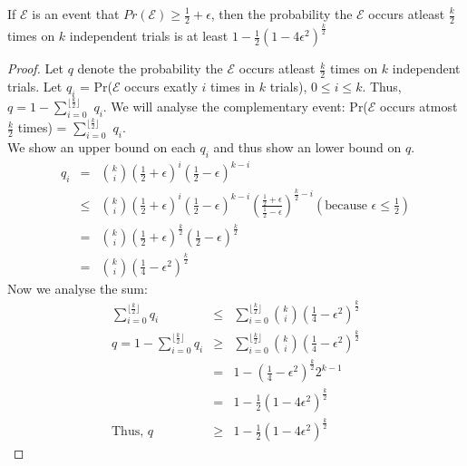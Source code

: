\begin{lemma}
If $\mathcal{E}$ is an event that $Pr(\mathcal{E}) \geq \frac{1}{2} + \epsilon $, then the probability the $\mathcal{E}$ occurs atleast $\frac {k}{2}$ times on $k$ independent trials is at least 
$1-\frac{1}{2}(1-4\epsilon^2)^\frac{k}{2}$
\end{lemma}
\begin{proof}
Let $q$ denote the probability the $\mathcal{E}$ occurs atleast $\frac {k}{2}$ times on $k$ independent trials.
Let $q_i$ = Pr($\mathcal{E}$ occurs exatly $i$ times in $k$ trials), $0 \leq i \leq k$. Thus,
$q = 1 - \sum_{i=0}^{\lfloor\frac{k}{2}\rfloor}$ $q_i$. We will analyse the complementary event:
Pr($\mathcal{E}$ occurs atmost $\frac{k}{2}$ times) = $\sum_{i=0}^{\lfloor\frac{k}{2}\rfloor}$ $q_i$. \\ 
We show an upper bound on each $q_i$ and thus show an lower bound on $q$.
\begin{eqnarray*}
q_i & = & {k \choose i} (\frac{1}{2} + \epsilon)^{i} (\frac{1}{2} - \epsilon)^ {k-i} \\
& \leq & {k\choose i} \left(\frac{1}{2} + \epsilon\right)^{i} \left(\frac{1}{2} - \epsilon\right)^ {k-i} \left(\frac{\frac{1}{2} + \epsilon}{\frac{1}{2} - \epsilon}\right)^{\frac{k}{2} - i}  (\textrm{because }\epsilon \le \frac{1}{2} ) \\
& = & {k\choose i}\left(\frac{1}{2} + \epsilon\right)^{\frac{k}{2}}\left(\frac{1}{2} - \epsilon\right)^{\frac{k}{2}} \\
&= & {k\choose i} \left(\frac{1}{4} - \epsilon^2\right)^{\frac{k}{2}}
\end{eqnarray*}
Now we analyse the sum:
\begin{eqnarray*}
\sum_{i=0}^{\lfloor\frac{k}{2}\rfloor}q_i & \leq & \sum_{i=0}^{\lfloor\frac{k}{2}\rfloor}{k\choose i} \left(\frac{1}{4} - \epsilon^2\right)^{\frac{k}{2}} \\
q = 1 - \sum_{i=0}^{\lfloor\frac{k}{2}\rfloor}q_i & \geq & \sum_{i=0}^{\lfloor\frac{k}{2}\rfloor}{k\choose i} \left(\frac{1}{4} - \epsilon^2\right)^{\frac{k}{2}} \\
& = & 1 - \left(\frac{1}{4} - \epsilon^2\right)^{\frac{k}{2}} 2^{k-1} \\
& = & 1 - \frac{1}{2} \left(1 - 4\epsilon^2\right)^{\frac{k}{2}} \\
\textrm {Thus, } q & \ge & 1 - \frac{1}{2} \left(1 - 4\epsilon^2\right)^{\frac{k}{2}}
\end{eqnarray*}
\end{proof}

